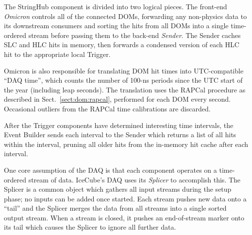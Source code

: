 The StringHub component is divided into two logical pieces.  The front-end
\emph{Omicron} controls all of the connected DOMs, forwarding any
non-physics data to its downstream consumers and sorting the hits from all
DOMs into a single time-ordered stream
before passing them to the back-end \emph{Sender}.  The Sender
caches SLC and HLC hits in memory, then forwards a condensed version of
each HLC hit to the appropriate local Trigger.

Omicron is also responsible for translating DOM hit times into
UTC-compatible ``DAQ time'', which counts the number of 100-ns periods
since the UTC start of the year (including leap seconds).  The translation
uses the RAPCal procedure as described in Sect.~\ref{sect:dom:rapcal},
performed for each DOM every second. Occasional outliers from the RAPCal time
calibrations are discarded.


After the Trigger components have determined interesting time intervals, the
Event Builder sends each interval to the Sender which returns a list
of all hits within the interval, pruning all older
hits from the in-memory hit cache after each interval.


One core assumption of the DAQ is that each component operates on a
time-ordered stream of data.  IceCube's DAQ uses its \emph{Splicer} to
accomplish this.  The Splicer is a common object which gathers all input
streams during the setup phase; no inputs can be added once started.  Each
stream pushes new data onto a ``tail'' and the Splicer merges
the data from all streams into a single sorted output stream.  When a
stream is closed, it pushes an end-of-stream marker onto its tail which causes
the Splicer to ignore all further data.



